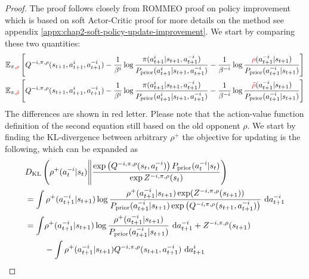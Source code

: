 \begin{proof}
The proof follows closely from ROMMEO proof on policy improvement \cite{tian2019regularized} which is based on soft Actor-Critic \cite{haarnoja2018softa} proof for more details on the method see appendix \ref{appx:chap2-soft-policy-update-improvement}. We start by comparing these two quantities:
\begin{equation*}
\begin{aligned}
    &\mathbb{E}_{\pi, {\color{red} \rho}}\left[ Q^{-i, \pi, \rho}(s_{t+1}, a^i_{t+1}, a^{-i}_{t+1}) - \frac{1}{\beta^i} \log\frac{\pi(a^i_{t+1}|s_{t+1}, a^{-i}_{t+1})}{P_{\text{prior}}(a^i_{t+1}|s_{t+1}, a^{-i}_{t+1})} - \frac{1}{\beta^{-i}}\log \frac{{\color{red} \rho}(a^{-i}_{t+1}|s_{t+1})}{P_{\text{prior}}(a^{-i}_{t+1}|s_{t+1})} \right] \\
    &\mathbb{E}_{\pi, {\color{red} \tilde{\rho}}}\left[ Q^{-i, \pi, \rho}(s_{t+1}, a^i_{t+1}, a^{-i}_{t+1}) - \frac{1}{\beta^i} \log\frac{\pi(a^i_{t+1}|s_{t+1}, a^{-i}_{t+1})}{P_{\text{prior}}(a^i_{t+1}|s_{t+1}, a^{-i}_{t+1})} - \frac{1}{\beta^{-i}}\log \frac{{\color{red} \tilde{\rho}}(a^{-i}_{t+1}|s_{t+1})}{P_{\text{prior}}(a^{-i}_{t+1}|s_{t+1})} \right]
\end{aligned}
\end{equation*}
The differences are shown in red letter. Please note that the action-value function definition of the second equation still based on the old opponent $\rho$. We start by finding the KL-divergence between arbitrary $\rho^+$ the objective for updating is the following, which can be expanded as 
\begin{equation*}
\begin{aligned}
    &\kl \bracka{ \rho^+(a^{-i}_t | s_t) \Bigg\| \frac{\exp\bracka{Q^{-i, \pi, \rho}(s_t, a^{-i}_t)} P_\prior(a^{-i}_t | s_t)}{\exp Z^{-i, \pi, \rho}(s_t)}} \\
    &= \int  \rho^+(a^{-i}_{t+1} | s_{t+1}) \log \frac{\rho^+(a^{-i}_{t+1} | s_{t+1}) \exp(Z^{-i, \pi, \rho}(s_{t+1})) }{P_\prior(a^{-i}_{t+1} | s_{t+1}) \exp\bracka{Q^{-i, \pi, \rho}(s_{t+1}, a^{-i}_{t+1})} } \dby a^{-i}_{t+1} \\
    &=\begin{aligned}[t]
    \int &\rho^+(a^{-i}_{t+1} | s_{t+1}) \log\frac{\rho^+(a^{-i}_{t+1} | s_{t+1})}{P_\prior(a^{-i}_{t+1} | s_{t+1})} \dby a^{-i}_{t+1} + Z^{-i, \pi, \rho}(s_{t+1}) \\
    &- \int \rho^+(a^{-i}_{t+1} | s_{t+1}) Q^{-i, \pi, \rho}(s_{t+1}, a^{-i}_{t+1}) \dby a^{i}_{t+1}
    \end{aligned}
\end{aligned}

\end{equation*}
\end{proof}

